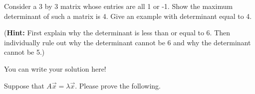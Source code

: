 \documentclass[]{exam}
\begin{document}
\begin{questions}

\question Consider a 3 by 3 matrix whose entries are all 1 or -1. Show the maximum determinant of such a matrix is 4. Give an example with determinant equal to 4. 

(\textbf{Hint:} First explain why the determinant is less than or equal to 6. Then individually rule out why the determinant cannot be 6 and why the determinant cannot be 5.)
	
\begin{solution}
	You can write your solution here!
\end{solution}

\question Suppose that $A \vec{x} = \lambda\vec{x}$. Please prove the following. 
	
\end{questions}
\end{document}
